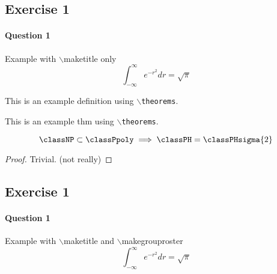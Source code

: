 \documentclass[a4paper]{scrartcl} %
\begin{document}
    \maketitle
    \subsection*{Exercise 1}
    \paragraph*{Question 1}
        Example with $\backslash${}maketitle only
    \[
        \int_{-\infty}^{\infty} e^{-r^2}dr = \sqrt\pi
    \]

    \begin{definition}
        This is an example definition using \texttt{$\backslash$theorems}.
    \end{definition}

    \begin{thm}
        This is an example thm using \texttt{$\backslash$theorems}.
    
        \[
            \classNP \subset \classPpoly \implies \classPH = \classPHsigma{2}
        \]
        \begin{proof}
            Trivial. (not really)
        \end{proof}
    \end{thm}


    \newpage
    \maketitle
    \makegrouproster
    \subsection*{Exercise 1}
    \paragraph*{Question 1}
        Example with $\backslash${}maketitle and $\backslash${}makegrouproster
    \[
        \int_{-\infty}^{\infty} e^{-r^2}dr = \sqrt\pi
    \]
\end{document}
